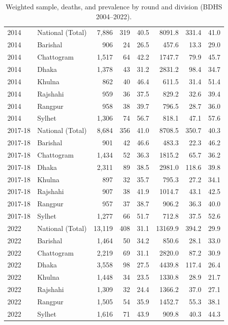 \begin{table}[htbp]
\begin{tabular}{llrrrrrr}
2014 & National (Total) & 7,886 & 319 & 40.5 & 8091.8 & 331.4 & 41.0 \\
2014 & Barishal & 906 & 24 & 26.5 & 457.6 & 13.3 & 29.0 \\
2014 & Chattogram & 1,517 & 64 & 42.2 & 1747.7 & 79.9 & 45.7 \\
2014 & Dhaka & 1,378 & 43 & 31.2 & 2831.2 & 98.4 & 34.7 \\
2014 & Khulna & 862 & 40 & 46.4 & 611.5 & 31.4 & 51.4 \\
2014 & Rajshahi & 959 & 36 & 37.5 & 829.2 & 32.6 & 39.4 \\
2014 & Rangpur & 958 & 38 & 39.7 & 796.5 & 28.7 & 36.0 \\
2014 & Sylhet & 1,306 & 74 & 56.7 & 818.1 & 47.1 & 57.6 \\
2017-18 & National (Total) & 8,684 & 356 & 41.0 & 8708.5 & 350.7 & 40.3 \\
2017-18 & Barishal & 901 & 42 & 46.6 & 483.3 & 22.3 & 46.2 \\
2017-18 & Chattogram & 1,434 & 52 & 36.3 & 1815.2 & 65.7 & 36.2 \\
2017-18 & Dhaka & 2,311 & 89 & 38.5 & 2981.0 & 118.6 & 39.8 \\
2017-18 & Khulna & 897 & 32 & 35.7 & 795.3 & 27.2 & 34.1 \\
2017-18 & Rajshahi & 907 & 38 & 41.9 & 1014.7 & 43.1 & 42.5 \\
2017-18 & Rangpur & 957 & 37 & 38.7 & 906.2 & 36.3 & 40.0 \\
2017-18 & Sylhet & 1,277 & 66 & 51.7 & 712.8 & 37.5 & 52.6 \\
2022 & National (Total) & 13,119 & 408 & 31.1 & 13169.9 & 394.2 & 29.9 \\
2022 & Barishal & 1,464 & 50 & 34.2 & 850.6 & 28.1 & 33.0 \\
2022 & Chattogram & 2,219 & 69 & 31.1 & 2820.0 & 87.2 & 30.9 \\
2022 & Dhaka & 3,558 & 98 & 27.5 & 4439.8 & 117.4 & 26.4 \\
2022 & Khulna & 1,448 & 34 & 23.5 & 1330.8 & 28.9 & 21.7 \\
2022 & Rajshahi & 1,309 & 32 & 24.4 & 1366.2 & 37.0 & 27.1 \\
2022 & Rangpur & 1,505 & 54 & 35.9 & 1452.7 & 55.3 & 38.1 \\
2022 & Sylhet & 1,616 & 71 & 43.9 & 909.8 & 40.3 & 44.3 \\
\bottomrule
\end{tabular}
\caption{Weighted sample, deaths, and prevalence by round and division (BDHS 2004--2022).}
\label{tab:table1_cohort}
\end{table}
